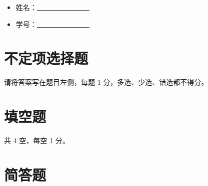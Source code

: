 \documentclass[a4]{article}
\begin{document}
\begin{itemize}
	\item 姓名：\underline{\quad~~~~~~~~~~~~~~~}
	\item 学号：\underline{\quad~~~~~~~~~~~~~~~}
\end{itemize}

\section{不定项选择题}

请将答案写在题目左侧，每题 1 分，多选、少选、错选都不得分。








\section{填空题}

共 4 空，每空 1 分。




\section{简答题}




\end{document}
